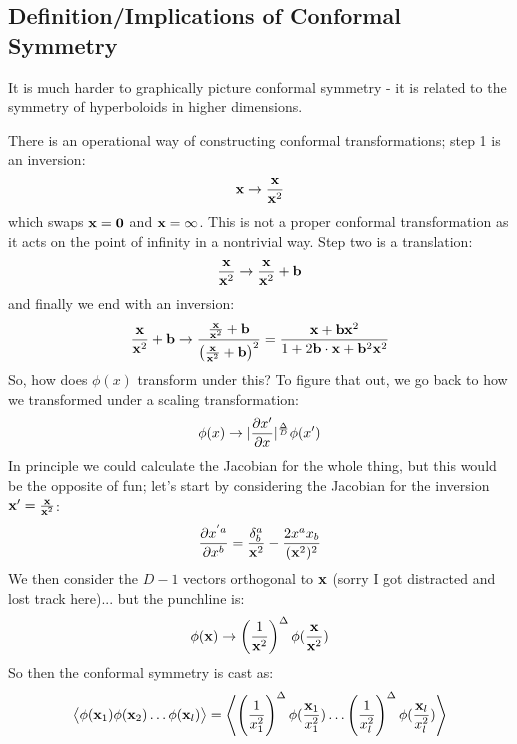 \subsection{Definition/Implications of Conformal Symmetry}
It is much harder to graphically picture conformal symmetry - it is related to the symmetry of hyperboloids in higher dimensions.

There is an operational way of constructing conformal transformations; step 1 is an inversion:
\begin{equation}
    \mathbf{x} \to \frac{\mathbf{x}}{\mathbf{x}^2}
\end{equation}
which swaps $\mathbf{x} = \mathbf{0}$ and $\mathbf{x} = \infty$. This is not a proper conformal transformation as it acts on the point of infinity in a nontrivial way. Step two is a translation:
\begin{equation}
    \frac{\mathbf{x}}{\mathbf{x}^2} \to \frac{\mathbf{x}}{\mathbf{x}^2} + \mathbf{b}
\end{equation}
and finally we end with an inversion:
\begin{equation}
    \frac{\mathbf{x}}{\mathbf{x}^2} + \mathbf{b} \to \frac{\frac{\mathbf{x}}{\mathbf{x}^2} + \mathbf{b}}{\left(\frac{\mathbf{x}}{\mathbf{x}^2} + \mathbf{b}\right)^2} = \frac{\mathbf{x} + \mathbf{b}\mathbf{x}^2}{1 + 2\mathbf{b}\cdot\mathbf{x} + \mathbf{b}^2\mathbf{x}^2}
\end{equation}
So, how does $\phi(x)$ transform under this? To figure that out, we go back to how we transformed under a scaling transformation:
\begin{equation}
    \phi(x) \to \abs{\dpd{x'}{x}}^{\frac{\Delta}{D}}\phi(x')
\end{equation}
In principle we could calculate the Jacobian for the whole thing, but this would be the opposite of fun; let's start by considering the Jacobian for the inversion $\mathbf{x}' = \frac{\mathbf{x}}{\mathbf{x}^2}$:
\begin{equation}
    \frac{\partial x^{'a}}{\partial x^b} = \frac{\delta^a_b}{\mathbf{x}^2} - \frac{2x^ax_b}{(\mathbf{x}^2)^2}
\end{equation}
We then consider the $D-1$ vectors orthogonal to $\mathbf{x}$ (sorry I got distracted and lost track here)... but the punchline is:
\begin{equation}
    \phi(\v{x}) \to \left(\frac{1}{\v{x}^2}\right)^{\Delta}\phi(\frac{\v{x}}{\v{x}^2})
\end{equation}
So then the conformal symmetry is cast as:
\begin{equation}
    \avg{\phi(\v{x}_1)\phi(\v{x}_2)\ldots \phi(\v{x}_l)} = \avg{\left(\frac{1}{x_1^2}\right)^\Delta \phi(\frac{\v{x}_1}{x_1^2}) \ldots \left(\frac{1}{x_l^2}\right)^\Delta \phi(\frac{\v{x}_l}{x_l^2})}
\end{equation}
